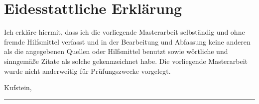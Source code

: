 \chapter*{Eidesstattliche Erklärung}
\thispagestyle{empty}

Ich erkläre hiermit, dass ich die vorliegende Masterarbeit selbständig und ohne fremde Hilfsmittel verfasst und in der Bearbeitung und Abfassung keine anderen als die angegebenen Quellen oder Hilfsmittel benutzt sowie wörtliche und sinngemäße Zitate als solche gekennzeichnet habe. Die vorliegende Masterarbeit wurde nicht anderweitig für Prüfungszwecke vorgelegt.

\vspace{2cm}
Kufstein, \mydate

\vspace{2cm}
\rule{10cm}{1pt}\\
\myname{}


